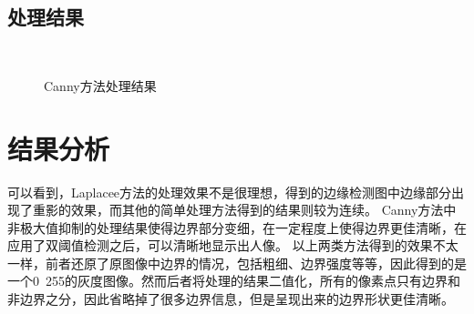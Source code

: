 \documentclass[UTF8]{ctexart}
\begin{document}
\subsection{处理结果}
\begin{figure}[htbp]
\centering
{}
\\
\caption{Canny方法处理结果}
\end{figure}

\section{结果分析}
可以看到，Laplacee方法的处理效果不是很理想，得到的边缘检测图中边缘部分出现了重影的效果，而其他的简单处理方法得到的结果则较为连续。
Canny方法中非极大值抑制的处理结果使得边界部分变细，在一定程度上使得边界更佳清晰，在应用了双阈值检测之后，可以清晰地显示出人像。
以上两类方法得到的效果不太一样，前者还原了原图像中边界的情况，包括粗细、边界强度等等，因此得到的是一个0~255的灰度图像。然而后者将处理的结果二值化，所有的像素点只有边界和非边界之分，因此省略掉了很多边界信息，但是呈现出来的边界形状更佳清晰。
\end{document}
